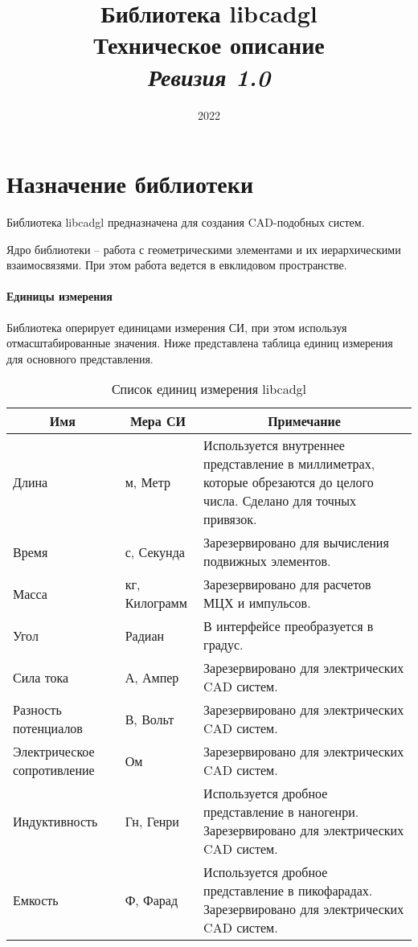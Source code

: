 \documentclass[a4paper, 12pt]{article}
\title{Библиотека libcadgl \\ \small{Техническое описание} \\ \small{\textit{Ревизия 1.0}}}
\date{2022}
\begin{document}
\maketitle

\newpage
\tableofcontents

\newpage
\section{Назначение библиотеки}
\label{section:library}
Библиотека libcadgl предназначена для создания CAD-подобных систем.

Ядро библиотеки -- работа с геометрическими элементами и их иерархическими
взаимосвязями. При этом работа ведется в евклидовом пространстве.

\paragraph{Единицы измерения}
Библиотека оперирует единицами измерения СИ, при этом используя отмасштабированные
значения. Ниже представлена таблица единиц измерения для основного представления.

\begin{table}[!h]
  \caption{Список единиц измерения libcadgl}
  \label{table:si_units}
  \begin{tabular}{|p{3cm}|p{3cm}|p{7cm}|}
    \hline
    \multicolumn{1}{|c|}{\textbf{Имя}} & \multicolumn{1}{|c|}{\textbf{Мера СИ}} & \multicolumn{1}{|c|}{\textbf{Примечание}} \\ \hline
    Длина & м, Метр & Используется внутреннее представление в миллиметрах,
    которые обрезаются до целого числа. Сделано для точных привязок. \\ \hline
    Время & с, Секунда & Зарезервировано для вычисления подвижных элементов. \\ \hline
    Масса & кг, Килограмм & Зарезервировано для расчетов МЦХ и импульсов. \\ \hline
    Угол & Радиан & В интерфейсе преобразуется в градус. \\ \hline
    Сила тока & А, Ампер & Зарезервировано для электрических CAD систем. \\ \hline
    Разность потенциалов & В, Вольт & Зарезервировано для электрических CAD систем. \\ \hline
    Электрическое сопротивление & Ом & Зарезервировано для электрических CAD систем. \\ \hline
    Индуктивность & Гн, Генри & Используется дробное представление в наногенри. Зарезервировано для электрических CAD систем. \\ \hline
    Емкость & Ф, Фарад & Используется дробное представление в пикофарадах.
    Зарезервировано для электрических CAD систем. \\ \hline
  \end{tabular}
\end{table}
\end{document}
